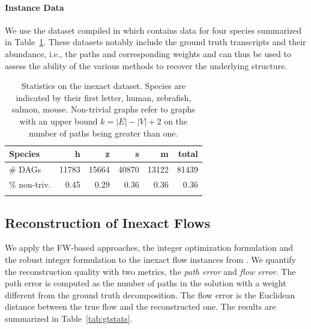 \documentclass{ecai}
\begin{document}
\paragraph*{Instance Data\\}
We use the dataset compiled in \cite{fernando_h_c_dias_2024_10775004} which contains data for four species summarized in Table~\ref{tab:inexactcounts}.
These datasets notably include the ground truth transcripts and their abundance, i.e., the paths and corresponding weights and can thus be used to assess the ability of the various methods to recover the underlying structure.

\begin{table}
\centering
\caption{Statistics on the inexact dataset. Species are indicated by their first letter, human, zebrafish, salmon, mouse.
Non-trivial graphs refer to graphs with an upper bound $k = |E| - |V| + 2$ on the number of paths being greater than one.
\vspace*{0.2cm}
}
\begin{tabular}{lrrrrr}
\toprule
Species & h & z & s & m & total \\
\midrule
\# DAGs  &  11783 & 15664 & 40870 & 13122 & 81439\\
$\%$ non-triv. & 0.45 & 0.29 & 0.36 & 0.36 & 0.36 \\
\bottomrule
\vspace*{0.01cm}
\end{tabular}
\label{tab:inexactcounts}
\end{table}

\subsection{Reconstruction of Inexact Flows}

We apply the FW-based approaches, the integer optimization formulation and the robust integer formulation to the inexact flow instances from \cite{fernando_h_c_dias_2024_10775004}.
We quantify the reconstruction quality with two metrics, the \emph{path error} and \emph{flow error}.
The path error is computed as the number of paths in the solution with a weight different from the ground truth decomposition.
The flow error is the Euclidean distance between the true flow and the reconstructed one.
The results are summarized in Table~\ref{tab:gtstats}.
\end{document}

